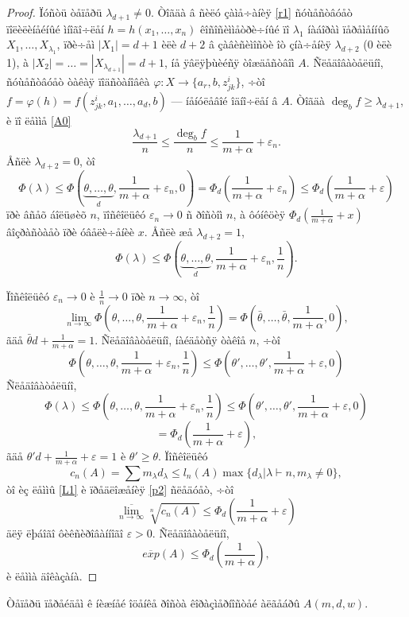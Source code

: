 \documentclass{article}
\numberwithin{equation}{section}
\theoremstyle{plain}
\theoremstyle{definition}
\newtheorem{proof}{Äîêàçàòåëüñòâî}
\begin{document}
\begin{fulltext}
\begin{proof}
Ïóñòü òåïåðü $\lambda_{d+1}\ne 0$. Òîãäà â ñèëó çàìå÷àíèÿ \ref{r1} ñóùåñòâóåò ïîëèëèíåéíûé
ìíîãî÷ëåí $h=h(x_1,\ldots,x_n)$ êîñîñèììåòðè÷íûé ïî $\lambda_1$ íàáîðàì ïåðåìåííûõ
$X_{1},\ldots, X_{\lambda_1}$, ïðè÷åì $|X_1|=d+1$ èëè $d+2$ â çàâèñèìîñòè îò çíà÷åíèÿ
$\lambda_{d+2}$ (0 èëè 1), à $|X_2|=\ldots= |X_{\lambda_{d+1}}|=d+1$, íå ÿâëÿþùèéñÿ
òîæäåñòâîì $A$. Ñëåäîâàòåëüíî, ñóùåñòâóåò òàêàÿ ïîäñòàíîâêà $\varphi: X\to\{a_r,b,z^i_{jk}\}$,
÷òî $f=\varphi(h)=f(z^i_{jk},a_1,\ldots, a_d,b)$ --- íåíóëåâîé îäíî÷ëåí â $A$. Òîãäà
$\deg_b f\ge \lambda_{d+1}$, è ïî ëåììå \ref{A0}
$$
\frac{\lambda_{d+1}}{n} \le \frac{\deg_b f}{n} \le \frac{1}{m+\alpha} + \varepsilon_n.
$$
Åñëè $\lambda_{d+2}=0$, òî
$$
\Phi(\lambda) \le \Phi(\underbrace{\theta,\ldots,\theta}_d,\frac{1}{m+\alpha}+\varepsilon_n,0)
= \Phi_d(\frac{1}{m+\alpha}+\varepsilon_n) \le \Phi_d(\frac{1}{m+\alpha}+\varepsilon)
$$
ïðè âñåõ áîëüøèõ $n$, ïîñêîëüêó $\varepsilon_n\to 0$  ñ ðîñòîì $n$, à ôóíêöèÿ
$\Phi_d(\frac{1}{m+\alpha}+x)$ âîçðàñòàåò  ïðè óâåëè÷åíèè $x$. Åñëè æå $\lambda_{d+2}=1$,
$$
\Phi(\lambda) \le 
\Phi(\underbrace{\theta,\ldots,\theta}_d,\frac{1}{m+\alpha}+\varepsilon_n,\frac{1}{n}).
$$

Ïîñêîëüêó $\varepsilon_n\to 0$ è $\frac{1}{n}\to 0$ ïðè $n\to\infty$, òî 
$$
\lim_{n\to\infty}\Phi(\theta,\ldots,\theta,\frac{1}{m+\alpha}+\varepsilon_n,\frac{1}{n})
=\Phi(\bar\theta,\ldots,\bar\theta,\frac{1}{m+\alpha},0),
$$
ãäå $\bar\theta d+\frac{1}{m+\alpha}=1$. Ñëåäîâàòåëüíî, íàéäåòñÿ òàêîå $n$, ÷òî
$$
\Phi(\theta,\ldots,\theta,\frac{1}{m+\alpha}+\varepsilon_n,\frac{1}{n}) \le 
\Phi(\theta',\ldots,\theta',\frac{1}{m+\alpha}+\varepsilon,0)
$$
Ñëåäîâàòåëüíî,
$$
\Phi(\lambda) \le 
\Phi\left(\theta,\ldots,\theta,\frac{1}{m+\alpha}+\varepsilon_n,\frac{1}{n}\right) \le 
\Phi\left(\theta',\ldots,\theta',\frac{1}{m+\alpha}+\varepsilon,0\right)
$$
$$ 
= \Phi_d\left(\frac{1}{m+\alpha}+\varepsilon\right),
$$
ãäå $\theta'd+ \frac{1}{m+\alpha}+\varepsilon=1$ è $\theta' \ge \theta$.
Ïîñêîëüêó
$$
c_n(A)=\sum m_\lambda d_\lambda \le l_n(A) \max\{d_\lambda| \lambda\vdash n, m_\lambda\ne 0\},
$$
òî èç ëåììû \ref{L1} è ïðåäëîæåíèÿ \ref{p2} ñëåäóåò, ÷òî
$$
\overline{\lim_{n\to\infty}}\sqrt[n]{c_n(A)} \le 
\Phi_d\left(\frac{1}{m+\alpha}+\varepsilon\right)
$$
äëÿ ëþáîãî ôèêñèðîâàííîãî $\varepsilon >0$. Ñëåäîâàòåëüíî, 
$$
\overline{exp}(A) \le \Phi_d\left(\frac{1}{m+\alpha}\right),
$$
è ëåììà äîêàçàíà.

\end{proof}

Òåïåðü ïåðåéäåì ê íèæíåé îöåíêå ðîñòà êîðàçìåðíîñòåé àëãåáðû $A(m,d,w)$.


\end{fulltext}
\end{document}
